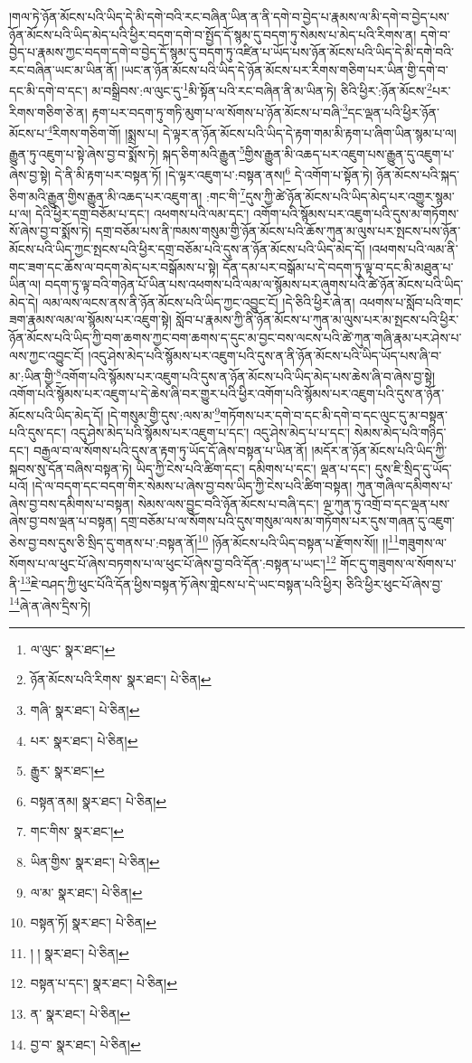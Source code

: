།གལ་ཏེ་ཉོན་མོངས་པའི་ཡིད་དེ་མི་དགེ་བའི་རང་བཞིན་ཡིན་ན་ནི་དགེ་བ་བྱེད་པ་རྣམས་ལ་མི་དགེ་བ་བྱེད་པས་ཉོན་མོངས་པའི་ཡིད་མེད་པའི་ཕྱིར་བདག་དགེ་བ་སྤྱོད་དོ་སྙམ་དུ་བདག་ཏུ་སེམས་པ་མེད་པའི་རིགས་ན། དགེ་བ་བྱེད་པ་རྣམས་ཀྱང་བདག་དགེ་བ་བྱེད་དོ་སྙམ་དུ་བདག་ཏུ་འཛིན་པ་ཡོད་པས་ཉོན་མོངས་པའི་ཡིད་དེ་མི་དགེ་བའི་རང་བཞིན་ཡང་མ་ཡིན་ནོ། །ཡང་ན་ཉོན་མོངས་པའི་ཡིད་དེ་ཉོན་མོངས་པར་རིགས་གཅིག་པར་ཡིན་གྱི་དགེ་བ་དང་མི་དགེ་བ་དང་། མ་བསྒྲིབས་:ལ་ལུང་དུ་\footnote{ལ་ལུང་  སྣར་ཐང་། }མི་སྟོན་པའི་རང་བཞིན་ནི་མ་ཡིན་ཏེ། ཅིའི་ཕྱིར་:ཉོན་མོངས་\footnote{ཉོན་མོངས་པའི་རིགས་  སྣར་ཐང་།  པེ་ཅིན། }པར་རིགས་གཅིག་ཅེ་ན། རྟག་པར་བདག་ཏུ་གཏི་མུག་པ་ལ་སོགས་པ་ཉོན་མོངས་པ་བཞི་\footnote{གཞི་  སྣར་ཐང་།  པེ་ཅིན། }དང་ལྡན་པའི་ཕྱིར་ཉོན་མོངས་པ་\footnote{པར་  སྣར་ཐང་།  པེ་ཅིན། }རིགས་གཅིག་གོ། །སྨྲས་པ། དེ་ལྟར་ན་ཉོན་མོངས་པའི་ཡིད་དེ་རྟག་གམ་མི་རྟག་པ་ཞིག་ཡིན་སྙམ་པ་ལ། རྒྱུན་ཏུ་འཇུག་པ་སྟེ་ཞེས་བྱ་བ་སྨོས་ཏེ། སྐད་ཅིག་མའི་རྒྱུན་\footnote{རྒྱུར་  སྣར་ཐང་། }གྱིས་རྒྱུན་མི་འཆད་པར་འཇུག་པས་རྒྱུན་དུ་འཇུག་པ་ཞེས་བྱ་སྟེ། དེ་ནི་མི་རྟག་པར་བསྟན་ཏོ། །དེ་ལྟར་འཇུག་པ་:བསྟན་ནས།\footnote{བསྟན་ནམ།  སྣར་ཐང་།  པེ་ཅིན། } དེ་འགོག་པ་སྟོན་ཏེ། ཉོན་མོངས་པའི་སྐད་ཅིག་མའི་རྒྱུན་གྱིས་རྒྱུན་མི་འཆད་པར་འཇུག་ན། :གང་གི་\footnote{གང་གིས་  སྣར་ཐང་། }དུས་ཀྱི་ཚེ་ཉོན་མོངས་པའི་ཡིད་མེད་པར་འགྱུར་སྙམ་པ་ལ། དེའི་ཕྱིར་དགྲ་བཅོམ་པ་དང་། འཕགས་པའི་ལམ་དང་། འགོག་པའི་སྙོམས་པར་འཇུག་པའི་དུས་མ་གཏོགས་སོ་ཞེས་བྱ་བ་སྨོས་ཏེ། དགྲ་བཅོམ་པས་ནི་ཁམས་གསུམ་གྱི་ཉོན་མོངས་པའི་ཆོས་ཀུན་མ་ལུས་པར་སྤངས་པས་ཉོན་མོངས་པའི་ཡིད་ཀྱང་སྤངས་པའི་ཕྱིར་དགྲ་བཅོམ་པའི་དུས་ན་ཉོན་མོངས་པའི་ཡིད་མེད་དོ། །འཕགས་པའི་ལམ་ནི་གང་ཟག་དང་ཆོས་ལ་བདག་མེད་པར་བསྒོམས་པ་སྟེ། དོན་དམ་པར་བསྒོམ་པ་དེ་བདག་ཏུ་ལྟ་བ་དང་མི་མཐུན་པ་ཡིན་ལ། བདག་ཏུ་ལྟ་བའི་གཉེན་པོ་ཡིན་པས་འཕགས་པའི་ལམ་ལ་སྙོམས་པར་ཞུགས་པའི་ཚེ་ཉོན་མོངས་པའི་ཡིད་མེད་དེ། ལམ་ལས་ལངས་ནས་ནི་ཉོན་མོངས་པའི་ཡིད་ཀྱང་འབྱུང་ངོ། །དེ་ཅིའི་ཕྱིར་ཞེ་ན། འཕགས་པ་སློབ་པའི་གང་ཟག་རྣམས་ལམ་ལ་སྙོམས་པར་འཇུག་སྟེ། སློབ་པ་རྣམས་ཀྱི་ནི་ཉོན་མོངས་པ་ཀུན་མ་ལུས་པར་མ་སྤངས་པའི་ཕྱིར་ཉོན་མོངས་པའི་ཡིད་ཀྱི་བག་ཆགས་ཀྱང་བག་ཆགས་ད་དུང་མ་བྱང་བས་ལངས་པའི་ཚེ་ཀུན་གཞི་རྣམ་པར་ཤེས་པ་ལས་ཀྱང་འབྱུང་ངོ། །འདུ་ཤེས་མེད་པའི་སྙོམས་པར་འཇུག་པའི་དུས་ན་ནི་ཉོན་མོངས་པའི་ཡིད་ཡོད་པས་ཞི་བ་མ་:ཡིན་གྱི་\footnote{ཡིན་གྱིས་  སྣར་ཐང་།  པེ་ཅིན། }འགོག་པའི་སྙོམས་པར་འཇུག་པའི་དུས་ན་ཉོན་མོངས་པའི་ཡིད་མེད་པས་ཆེས་ཞི་བ་ཞེས་བྱ་སྟེ། འགོག་པའི་སྙོམས་པར་འཇུག་པ་དེ་ཆེས་ཞི་བར་གྱུར་པའི་ཕྱིར་འགོག་པའི་སྙོམས་པར་འཇུག་པའི་དུས་ན་ཉོན་མོངས་པའི་ཡིད་མེད་དོ། །དེ་གསུམ་གྱི་དུས་:ལས་མ་\footnote{ལ་མ་  སྣར་ཐང་།  པེ་ཅིན། }གཏོགས་པར་དགེ་བ་དང་མི་དགེ་བ་དང་ལུང་དུ་མ་བསྟན་པའི་དུས་དང་། འདུ་ཤེས་མེད་པའི་སྙོམས་པར་འཇུག་པ་དང་། འདུ་ཤེས་མེད་པ་པ་དང་། སེམས་མེད་པའི་གཉིད་དང་། བརྒྱལ་བ་ལ་སོགས་པའི་དུས་ན་རྟག་ཏུ་ཡོད་དོ་ཞེས་བསྟན་པ་ཡིན་ནོ། །མདོར་ན་ཉོན་མོངས་པའི་ཡིད་ཀྱི་སྐབས་སུ་དོན་བཞིས་བསྟན་ཏེ། ཡིད་ཀྱི་ངེས་པའི་ཚིག་དང་། དམིགས་པ་དང་། ལྡན་པ་དང་། དུས་ཇི་སྲིད་དུ་ཡོད་པའོ། །དེ་ལ་བདག་དང་བདག་གིར་སེམས་པ་ཞེས་བྱ་བས་ཡིད་ཀྱི་ངེས་པའི་ཚིག་བསྟན། ཀུན་གཞིལ་དམིགས་པ་ཞེས་བྱ་བས་དམིགས་པ་བསྟན། སེམས་ལས་བྱུང་བའི་ཉོན་མོངས་པ་བཞི་དང་། ལྔ་ཀུན་ཏུ་འགྲོ་བ་དང་ལྡན་པས་ཞེས་བྱ་བས་ལྡན་པ་བསྟན། དགྲ་བཅོམ་པ་ལ་སོགས་པའི་དུས་གསུམ་ལས་མ་གཏོགས་པར་དུས་གཞན་དུ་འཇུག་ཅེས་བྱ་བས་དུས་ཅི་སྲིད་དུ་གནས་པ་:བསྟན་ནོ།\footnote{བསྟན་ཏོ།  སྣར་ཐང་།  པེ་ཅིན། } །ཉོན་མོངས་པའི་ཡིད་བསྟན་པ་རྫོགས་སོ།། །།\footnote{། །  སྣར་ཐང་།  པེ་ཅིན། }གཟུགས་ལ་སོགས་པ་ལ་ཕུང་པོ་ཞེས་བཏགས་པ་ལ་ཕུང་པོ་ཞེས་བྱ་བའི་དོན་:བསྟན་པ་ཡང་།\footnote{བསྟན་པ་དང་།  སྣར་ཐང་།  པེ་ཅིན། } གོང་དུ་གཟུགས་ལ་སོགས་པ་ནི་\footnote{ན་  སྣར་ཐང་།  པེ་ཅིན། }ཇེ་བཤད་ཀྱི་ཕུང་པོའི་དོན་ཕྱིས་བསྟན་ཏོ་ཞེས་གླེངས་པ་དེ་ཡང་བསྟན་པའི་ཕྱིར། ཅིའི་ཕྱིར་ཕུང་པོ་ཞེས་བྱ་\footnote{བྱ་བ་  སྣར་ཐང་།  པེ་ཅིན། }ཞེ་ན་ཞེས་དྲིས་ཏེ། 